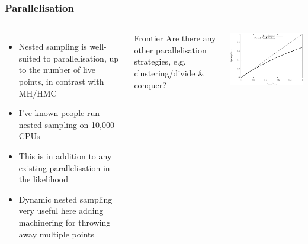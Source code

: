\documentclass[aspectratio=169]{beamer}
\begin{document}
\begin{frame}
    \frametitle{Parallelisation}
    \begin{columns}
        \begin{itemize}
            \item Nested sampling is well-suited to parallelisation, up to the number of live points, in contrast with MH/HMC
            \item I've known people run nested sampling on 10,000 CPUs
            \item This is in addition to any existing parallelisation in the likelihood
            \item Dynamic nested sampling very useful here adding machinering for throwing away multiple points~
        \end{itemize}
        \begin{alertblock}{Frontier}
            Are there any other parallelisation strategies, e.g. clustering/divide \& conquer?
        \end{alertblock}
        \includegraphics[width=\textwidth]{figures/parallelisation}
    \end{columns}
\end{frame}
\end{document}
